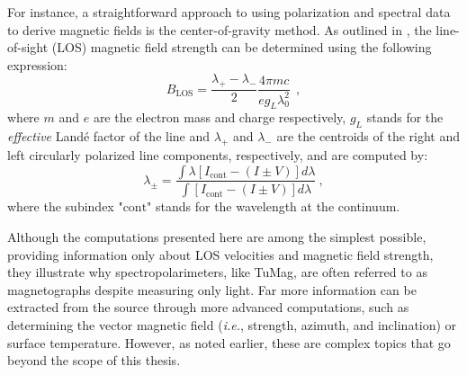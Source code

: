 For instance, a straightforward approach to using polarization and spectral data to derive magnetic fields is the center-of-gravity method. As outlined in \cite{center_of_gravity}, the line-of-sight (LOS) magnetic field strength can be determined using the following expression:
\begin{equation}
  B_{\text{LOS}} = \frac{\lambda _ {+} - \lambda _ -}{2}\frac{4\pi m c}{eg_{L}\lambda_0 ^2}\ \ ,
  \label{eq_spectro: Blos-cog}
\end{equation}  
where $m$ and $e$ are the electron mass and charge respectively, $g_L$ stands for the \emph{effective} Landé factor of the line and $\lambda _ {+}$ and $\lambda _ {-}$ are the centroids of the right and left circularly polarized line components, respectively, and are computed by:
\begin{equation}
  \lambda _ {\pm} = \frac{\int \lambda \left[I_{\text{cont}} - (I \pm V)\right]d\lambda}{\int \left[I_{\text{cont}} - (I \pm V)\right]d\lambda} \ ,
  \label{eq_spectro: lambda_plus_minus}
\end{equation} 
where the subindex "$\text{cont}$" stands for the wavelength at the continuum. 

Although the computations presented here are among the simplest possible, providing information only about LOS velocities and magnetic field strength, they illustrate why spectropolarimeters, like TuMag, are often referred to as magnetographs despite measuring only light. Far more information can be extracted from the source through more advanced computations, such as determining the vector magnetic field (\textit{i.e.}, strength, azimuth, and inclination) or surface temperature. However, as noted earlier, these are complex topics that go beyond the scope of this thesis.